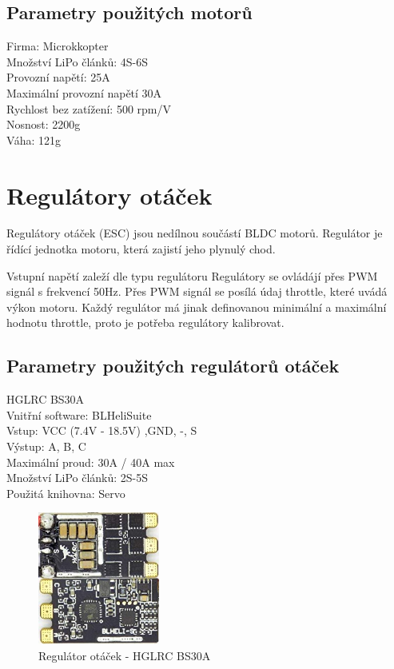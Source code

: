 \subsection{Parametry použitých motorů} 
Firma: Microkkopter\\
Množství LiPo článků: 4S-6S\\
Provozní napětí: 25A\\
Maximální provozní napětí 30A\\
Rychlost bez zatížení: 500 rpm/V\\
Nosnost: 2200g\\
Váha: 121g\\

\section{Regulátory otáček} 
Regulátory otáček (ESC) jsou nedílnou součástí BLDC motorů. Regulátor je řídící jednotka motoru, která zajistí jeho plynulý chod.

Vstupní napětí zaleží dle typu regulátoru
Regulátory se ovládájí přes PWM signál s frekvencí 50Hz. Přes PWM signál se posílá údaj throttle, které uvádá výkon motoru. Každý regulátor má jinak definovanou minimální a maximální hodnotu throttle, proto je potřeba regulátory kalibrovat.

\subsection{Parametry použitých regulátorů otáček}
HGLRC BS30A\\
Vnitřní software: BLHeliSuite\\
Vstup: VCC (7.4V - 18.5V) ,GND, -, S\\
Výstup: A, B, C\\
Maximální proud: 30A / 40A max\\
Množství LiPo článků: 2S-5S\\
Použitá knihovna: Servo\\

\begin{figure}[h]
	\centering
	\includegraphics[width=4cm]{pictures/esc.jpg}
	\caption{Regulátor otáček - HGLRC BS30A}
\end{figure}


